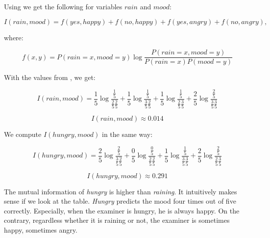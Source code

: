 Using  we get the following for variables $\mathit{rain}$ and $\mathit{mood}$:


\begin{equation}
	I(\mathit{rain}, \mathit{mood}) =
	f(yes, happy) +
	f(no, happy) +
	f(yes, angry) +
	f(no, angry),
\end{equation}

where:

\begin{equation}
	f(x, y) = P(rain=x,mood=y)\log\frac{P(rain=x,mood=y)}{P(rain=x)P(mood=y)}
\end{equation}


With the values from , we get:

\begin{equation}
	I(\mathit{rain}, \mathit{mood}) =
	\frac{1}{5}
		\log \frac{
	\frac{1}{5}
	}{
	\frac{2}{5}
	\frac{2}{5}
	} +
%
	\frac{1}{5}
		\log \frac{
	\frac{1}{5}
	}{
	\frac{3}{5}
	\frac{2}{5}
	} +
%
	\frac{1}{5}
		\log \frac{
	\frac{1}{5}
	}{
	\frac{2}{5}
	\frac{3}{5}
	} +
%
	\frac{2}{5}
		\log \frac{
	\frac{2}{5}
	}{
	\frac{3}{5}
	\frac{3}{5}
	}
\end{equation}

\begin{equation}
	I(\mathit{rain}, \mathit{mood}) \approx 0.014
\end{equation}

We compute $I(\mathit{hungry}, \mathit{mood})$ in the same way:

\begin{equation}
	I(\mathit{hungry}, \mathit{mood}) =
	\frac{2}{5}
		\log \frac{
	\frac{2}{5}
	}{
	\frac{3}{5}
	\frac{2}{5}
	} +
%
	\frac{0}{5}
		\log \frac{
	\frac{0}{5}
	}{
	\frac{2}{5}
	\frac{2}{5}
	} +
%
	\frac{1}{5}
		\log \frac{
	\frac{1}{5}
	}{
	\frac{3}{5}
	\frac{3}{5}
	} +
%
	\frac{2}{5}
		\log \frac{
	\frac{2}{5}
	}{
	\frac{2}{5}
	\frac{3}{5}
	}
\end{equation}

\begin{equation}
	I(\mathit{hungry}, \mathit{mood}) \approx 0.291
\end{equation}

The mutual information of \textit{hungry} is higher than \textit{raining}.
It intuitively makes sense if we look at the table.
\textit{Hungry} predicts the mood four times out of five correctly.
Especially, when the examiner is hungry, he is always happy.
On the contrary, regardless whether it is raining or not, the examiner
is sometimes happy, sometimes angry.

